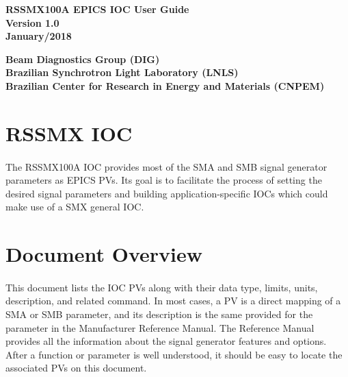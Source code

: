 \documentclass[openany]{article}
\begin{document}
\begin{titlepage}


\begin{center}

\vspace*{\fill}
\textbf{\Huge RSSMX100A EPICS IOC User Guide}\\[20pt]
\textbf{\Huge Version 1.0}\\[20pt]
\textbf{\Huge January/2018}
\vspace*{\fill}

\vfill
\textbf{Beam Diagnostics Group (DIG)}\\[5pt]
\textbf{Brazilian Synchrotron Light Laboratory (LNLS)}\\[5pt]
\textbf{Brazilian Center for Research in Energy and Materials (CNPEM)}
\end{center}

\end{titlepage}

\newpage
\pagestyle{plain} %

\tableofcontents

\newpage
\section{RSSMX IOC}

	\paragraph{} The RSSMX100A IOC provides most of the SMA and SMB signal generator parameters as EPICS PVs. Its goal is to facilitate the process of setting the desired signal parameters and building application-specific IOCs which could make use of a SMX general IOC.

\section{Document Overview}

	\paragraph{} This document lists the IOC PVs along with their data type, limits, units, description, and related command. In most cases, a PV is a direct mapping of a SMA or SMB parameter, and its description is the same provided for the parameter in the Manufacturer Reference Manual. The Reference Manual provides all the information about the signal generator features and options. After a function or parameter is well understood, it should be easy to locate the associated PVs on this document.
\end{document}

